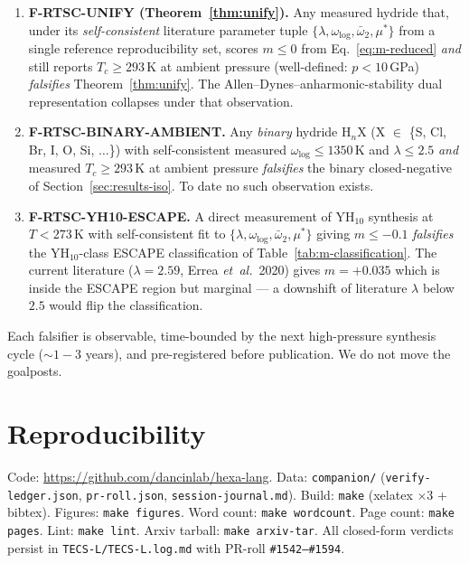 \documentclass[11pt,a4paper]{article}
\begin{document}
\begin{enumerate}\itemsep0.4em
\item \textbf{F-RTSC-UNIFY (Theorem~\ref{thm:unify}).} Any measured
hydride that, under its \emph{self-consistent} literature parameter
tuple $\{\lambda,\omega_{\log},\bar\omega_2,\mu^*\}$ from a single
reference reproducibility set, scores $m\leq 0$ from
Eq.~\ref{eq:m-reduced} \emph{and} still reports
$T_c\geq 293$\,K at ambient pressure (well-defined: $p<10$\,GPa)
\emph{falsifies} Theorem~\ref{thm:unify}. The
Allen--Dynes--anharmonic-stability dual representation collapses
under that observation.

\item \textbf{F-RTSC-BINARY-AMBIENT.} Any \emph{binary} hydride
H$_n$X (X $\in$ \{S, Cl, Br, I, O, Si, $\ldots$\}) with
self-consistent measured $\omega_{\log}\leq 1350$\,K and
$\lambda\leq 2.5$ \emph{and} measured $T_c\geq 293$\,K at ambient
pressure \emph{falsifies} the binary closed-negative of
Section~\ref{sec:results-iso}. To date no such observation exists.

\item \textbf{F-RTSC-YH10-ESCAPE.} A direct measurement of YH$_{10}$
synthesis at $T<273$\,K with self-consistent fit to
$\{\lambda,\omega_{\log},\bar\omega_2,\mu^*\}$ giving $m\leq -0.1$
\emph{falsifies} the YH$_{10}$-class ESCAPE classification of
Table~\ref{tab:m-classification}. The current literature
($\lambda=2.59$, Errea \emph{et~al.}~2020) gives $m=+0.035$ which is
inside the ESCAPE region but marginal --- a downshift of literature
$\lambda$ below $2.5$ would flip the classification.
\end{enumerate}

Each falsifier is observable, time-bounded by the next high-pressure
synthesis cycle ($\sim 1{-}3$ years), and pre-registered before
publication. We do not move the goalposts.

\section{Reproducibility}
\label{sec:repro}

Code: \url{https://github.com/dancinlab/hexa-lang}. Data:
\texttt{companion/} (\texttt{verify-ledger.json}, \texttt{pr-roll.json},
\texttt{session-journal.md}). Build: \texttt{make} (xelatex $\times 3$
+ bibtex). Figures: \texttt{make figures}. Word count:
\texttt{make wordcount}. Page count: \texttt{make pages}. Lint:
\texttt{make lint}. Arxiv tarball: \texttt{make arxiv-tar}. All
closed-form verdicts persist in \texttt{TECS-L/TECS-L.log.md} with
PR-roll \texttt{\#1542--\#1594}.
\end{document}
